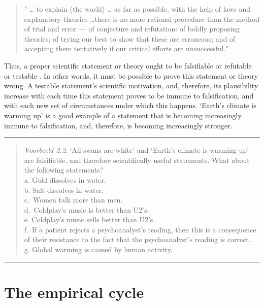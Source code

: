 \documentclass[
]{book}
\begin{document}
\begin{quote}
" \ldots{} to explain (the world) \ldots{} as far as possible, with the help of laws and explanatory theories \ldots there is no more rational procedure than the method of trial and error --- of conjecture and refutation: of boldly proposing theories; of trying our best to show that these are erroneous; and of accepting them tentatively if our critical efforts are unsuccessful."
\end{quote}

Thus, a proper scientific statement or theory ought to be falsifiable or refutable or testable \citep{Popp63}. In other words, it must be possible to prove this statement or theory wrong. A testable statement's scientific motivation, and, therefore, its plausibility increase with each time this statement proves to be immune to falsification, and with each new set of circumstances under which this happens. `Earth's climate is warming up' is a good example of a statement that is becoming increasingly immune to falsification, and, therefore, is becoming increasingly stronger.

\begin{center}\rule{0.5\linewidth}{0.5pt}\end{center}

\begin{quote}
\emph{Voorbeeld 2.2}: `All swans are white' and `Earth's climate is warming up' are falsifiable, and therefore scientifically useful statements. What about the following statements?\\
a. Gold dissolves in water.\\
b. Salt dissolves in water.\\
c.~Women talk more than men.\\
d.~Coldplay's music is better than U2's.\\
e. Coldplay's music sells better than U2's.\\
f.~If a patient rejects a psychoanalyst's reading, then this is a consequence of their resistance to the fact that the psychoanalyst's reading is correct.\\
g. Global warming is caused by human activity.
\end{quote}

\begin{center}\rule{0.5\linewidth}{0.5pt}\end{center}

\hypertarget{sec:empiricalcycle}{%
\section{The empirical cycle}\label{sec:empiricalcycle}}
\end{document}
